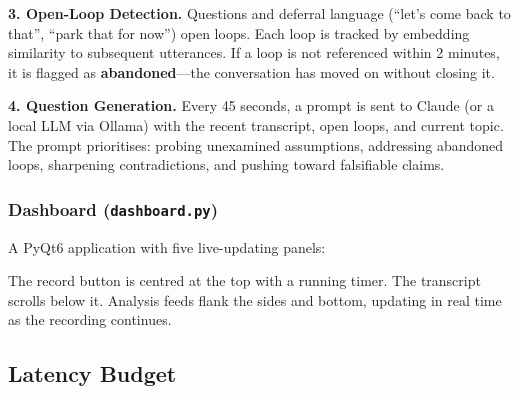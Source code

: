 \documentclass[11pt,letterpaper]{article}
\begin{document}
\textbf{3. Open-Loop Detection.} Questions and deferral language (``let's come back to that'', ``park that for now'') open loops. Each loop is tracked by embedding similarity to subsequent utterances. If a loop is not referenced within 2 minutes, it is flagged as \textbf{abandoned}---the conversation has moved on without closing it.

\textbf{4. Question Generation.} Every 45 seconds, a prompt is sent to Claude (or a local LLM via Ollama) with the recent transcript, open loops, and current topic. The prompt prioritises: probing unexamined assumptions, addressing abandoned loops, sharpening contradictions, and pushing toward falsifiable claims.

\subsubsection{Dashboard (\texttt{dashboard.py})}

A PyQt6 application with five live-updating panels:

\begin{center}
\end{center}

The record button is centred at the top with a running timer. The transcript scrolls below it. Analysis feeds flank the sides and bottom, updating in real time as the recording continues.

\subsection{Latency Budget}
\end{document}
